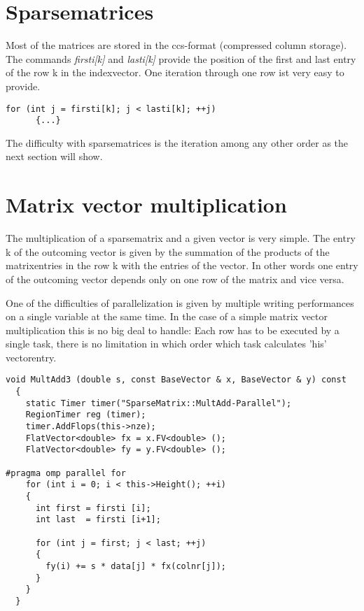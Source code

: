 \documentclass[a4paper,11pt]{scrartcl}
\begin{document}
\section{Sparsematrices}

Most of the matrices are stored in the ccs-format (compressed column storage).
 The commands {\em firsti[k]} and {\em lasti[k]} provide the position of the
 first and last entry of the row k in the indexvector. One
 iteration through one row ist very easy to provide.

\begin{lstlisting}
for (int j = firsti[k]; j < lasti[k]; ++j)
      {...}

\end{lstlisting}

The difficulty with sparsematrices is the iteration among any other order as 
the next section will show.

\section{Matrix vector multiplication}

The multiplication of a sparsematrix and a given vector is very simple. 
The entry k of the outcoming vector is given by the summation of the products 
of the matrixentries in the row k with the entries of the vector. In other 
words one entry of the outcoming vector depends only on one row of the matrix 
and vice versa.

One of the difficulties of parallelization is given by multiple writing 
performances on a single variable at the same time. In the case of a simple
 matrix vector multiplication this is no big deal to handle: Each row has to be
executed by a single task, there is no limitation in which order which task
 calculates 'his' vectorentry.

\begin{lstlisting}
void MultAdd3 (double s, const BaseVector & x, BaseVector & y) const
  {
    static Timer timer("SparseMatrix::MultAdd-Parallel");
    RegionTimer reg (timer);
    timer.AddFlops(this->nze);
    FlatVector<double> fx = x.FV<double> ();
    FlatVector<double> fy = y.FV<double> ();

#pragma omp parallel for
    for (int i = 0; i < this->Height(); ++i)
    {
      int first = firsti [i];
      int last  = firsti [i+1];

      for (int j = first; j < last; ++j)
      {
        fy(i) += s * data[j] * fx(colnr[j]);
      }
    }
  }

\end{lstlisting}
\end{document}
